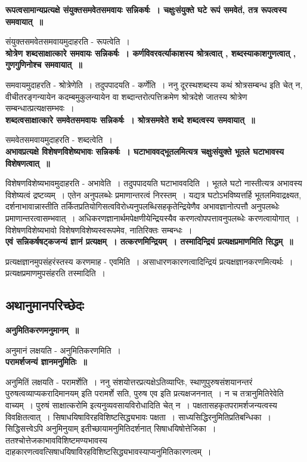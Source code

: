 	{\bfseries रूपत्वसामान्यप्रत्यक्षे संयुक्तसमवेतसमवायः सन्निकर्षः~। चक्षुःसंयुक्ते घटे रूपं समवेतं, तत्र रूपत्वस्य समवायात्~॥}\par
		संयुक्तसमवेतसमवायमुदाहरति - रूपत्वेति~।\\[10pt]
	{\bfseries श्रोत्रेण शब्दसाक्षात्कारे समवायः सन्निकर्षः~। कर्णविवरवर्त्याकाशस्य श्रोत्रत्वात् , शब्दस्याकाशगुणत्वात् , गुणगुणिनोश्च समवायात्~॥}\par
		समवायमुदाहरति - श्रोत्रेणेति~। तदुपपादयति - कर्णेति~। ननु दूरस्थशब्दस्य कथं श्रोत्रसम्बन्ध इति चेत् न, वीचीतरङ्गन्यायेन कदम्बमुकुलन्यायेन वा शब्दान्तरोत्पत्तिक्रमेण श्रोत्रदेशे जातस्य श्रोत्रेण सम्बन्धात्प्रत्यक्षसम्भवः~।\\[10pt]
	{\bfseries शब्दत्वसाक्षात्कारे समवेतसमवायः सन्निकर्षः~। श्रोत्रसमवेते शब्दे शब्दत्वस्य समवायात्~॥}\par
		समवेतसमवायमुदाहरति - शब्दत्वेति~।\\[10pt]
	{\bfseries अभावप्रत्यक्षे विशेषणविशेष्यभावः सन्निकर्षः~। घटाभाववद्भूतलमित्यत्र चक्षुःसंयुक्ते भूतले घटाभावस्य विशेषणत्वात्~॥}\par
		विशेषणविशेष्यभावमुदाहरति - अभावेति~। तदुपपादयति घटाभाववदिति~। भूतले घटो नास्तीत्यत्र अभावस्य विशेष्यत्वं द्रष्टव्यम्~। एतेन अनुपलब्धेः प्रमाणान्तरत्वं निरस्तम्~। यद्यत्र घटोऽभविष्यत्तर्हि भूतलमिवाद्रक्ष्यत, दर्शनाभावान्नास्तीति तर्कितप्रतियोगिसत्वविरोध्यनुपलब्धिसहकृतेन्द्रियेणैव अभावज्ञानोत्पत्तौ अनुपलब्धेः प्रमाणान्तरत्वासम्भवात्~। अधिकरणज्ञानार्थमपेक्षणीयेन्द्रियस्यैव करणत्वोपपत्तावनुपलब्धेः करणत्वायोगात्~। विशेषणविशेष्यभावो विशेषणविशेष्यस्वरूपमेव, नातिरिक्तः सम्बन्धः~।\\[10pt]
	{\bfseries एवं सन्निकर्षषट्कजन्यं ज्ञानं प्रत्यक्षम्~। तत्करणमिन्द्रियम्~। तस्मादिन्द्रियं प्रत्यक्षप्रमाणमिति सिद्धम्~॥}\par
		प्रत्यक्षज्ञानमुपसंहरंस्तस्य करणमाह - एवमिति~। असाधारणकारणत्वादिन्द्रियं प्रत्यक्षज्ञानकरणमित्यर्थः~। प्रत्यक्षप्रमाणमुपसंहरति तस्मादिति~। \subsection*{अथानुमानपरिच्छेदः}
	{\bfseries अनुमितिकरणमनुमानम्~॥}\par
		अनुमानं लक्षयति - अनुमितिकरणमिति~।\\[10pt]
	{\bfseries परामर्शजन्यं ज्ञानमनुमितिः~॥}\par
		अनुमितिं लक्षयति - परामर्शेति~। ननु संशयोत्तरप्रत्यक्षेऽतिव्याप्तिः, स्थाणुपुरुषसंशयानन्तरं पुरुषत्वव्याप्यकरादिमानयम् इति परामर्शे सति, पुरुष एव इति प्रत्यक्षजननात्~। न च तत्रानुमितिरेवेति वाच्यम्~। पुरुषं साक्षात्करोमि इत्यनुव्यवसायविरोधादिति चेत् न~। पक्षतासहकृतपरामर्शजन्यत्वस्य विवक्षितत्वात्~। सिषाधयिषाविरहविशिष्टसिद्ध्यभावः पक्षता~। साध्यसिद्धिरनुमितिप्रतिबन्धिका~। सिद्धिसत्त्वेऽपि अनुमिनुयाम् इतीच्छायामनुमितिदर्शनात् सिषाधयिषोत्तेजिका~। ततश्चोत्तेजकाभावविशिष्टमण्यभावस्य दाहकारणत्ववत्सिषाधयिषाविरहविशिष्टसिद्ध्यभावस्याप्यनुमितिकारणत्वम्~।\\[10pt]
